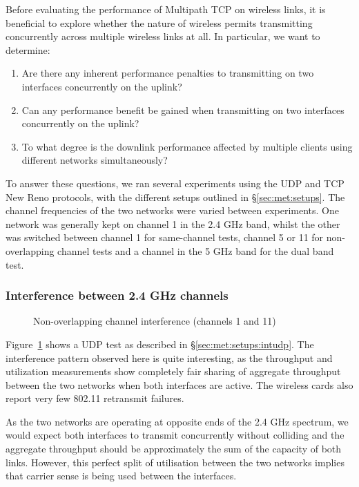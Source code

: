 Before evaluating the performance of Multipath TCP on wireless links, it is
beneficial to explore whether the nature of wireless permits transmitting
concurrently across multiple wireless links at all. In particular, we want
to determine:

\begin{enumerate}
  \item Are there any inherent performance penalties to transmitting on two
    interfaces concurrently on the uplink?
  \item Can any performance benefit be gained when transmitting on two
    interfaces concurrently on the uplink?
  \item To what degree is the downlink performance affected by multiple clients
    using different networks simultaneously?
\end{enumerate}

To answer these questions, we ran several experiments using the UDP and TCP New 
Reno protocols, with the different setups outlined in \S\ref{sec:met:setups}.      %
The channel frequencies of the two networks were varied between experiments. One
network was generally kept on channel 1 in the 2.4 GHz band, whilst the other
was switched between channel 1 for same-channel tests, channel 5 or 11 for
non-overlapping channel tests and a channel in the 5 GHz band for the dual band 
test. 

\subsubsection{Interference between 2.4 GHz channels}

\begin{figure}[h]
 \centering
 
 \caption{Non-overlapping channel interference (channels 1 and 11)}\label{graph:cc-interference}
\end{figure}

Figure~\ref{graph:cc-interference} shows a UDP test as described in 
\S\ref{sec:met:setups:intudp}.
The interference pattern observed here is quite interesting, as the throughput
and utilization measurements show completely fair sharing of aggregate
throughput between the two networks when both interfaces are active. The
wireless cards also report very few 802.11 retransmit failures.

As the two networks are operating at opposite ends of the 2.4 GHz spectrum, we
would expect both interfaces to transmit concurrently without colliding
and the aggregate throughput should be approximately the sum of the capacity of
both links. However, this perfect split of utilisation between the two networks
implies that carrier sense is being used between the interfaces.

